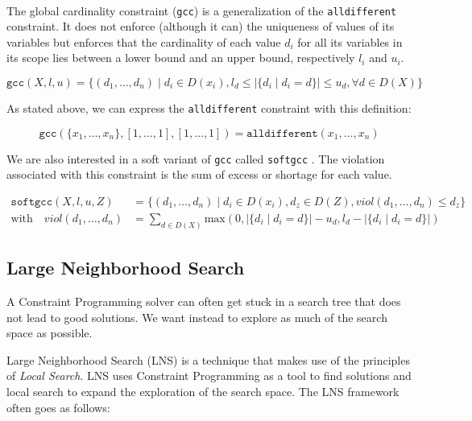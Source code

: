 \documentclass[../../thesis.tex]{subfiles}
\begin{document}
\paragraph{}


The global cardinality constraint (\texttt{gcc}) \cite{Regin:1996} is a generalization of the 
\texttt{alldifferent} constraint. It does not enforce (although it can) the uniqueness of values of its variables
but enforces that the cardinality of each value $d_i$ for all its variables in its scope lies
between a lower bound and an upper bound, respectively $l_i$ and $u_i$. 

\begin{equation*}
  \texttt{gcc}(X, l, u) = \{ (d_1, \dots, d_n) \mid d_i \in D(x_i), l_d \leq |\{ d_i \mid d_i = d \}| \leq u_d, \forall d \in D(X) \}
\end{equation*}

As stated above, we can express the \texttt{alldifferent} constraint with this definition:

\begin{equation*}
\texttt{gcc}(\{ x_1, \dots, x_n \}, [1, \dots, 1], [1, \dots, 1]) = \texttt{alldifferent}(x_1, \dots, x_n)
\end{equation*}


We are also interested in a soft variant of \texttt{gcc} called \texttt{softgcc} \cite{VanHoeve2006}. 
The violation associated with this constraint is the sum of excess or shortage \cite{schaus:softgcc} for each value.

\begin{align*}
  \texttt{softgcc}(X, l, u, Z) &= \{ (d_1, \dots, d_n) \mid d_i \in D(x_i), d_z \in D(Z), viol(d_1, \dots, d_n) \leq d_z \} \\
  \text{with} \quad viol(d_1, \dots, d_n) &= \sum_{d \in D(X)} \text{max}(0, |\{ d_i \mid d_i = d \}| - u_d, l_d - |\{ d_i \mid d_i = d \}|)
\end{align*}


\subsection{Large Neighborhood Search}

A Constraint Programming solver can often get stuck in a search tree that does not lead to good solutions.
We want instead to explore as much of the search space as possible. 

Large Neighborhood Search (LNS) is a technique that makes use of the principles of \emph{Local Search}.
LNS uses Constraint Programming as a tool to find solutions and local search to expand the exploration of the search space. 
The LNS framework often goes as follows:
\end{document}
